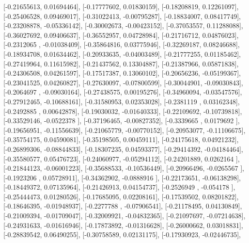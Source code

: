 \documentclass{article}
\begin{document}
       [-0.21655613,  0.01694464],
       [-0.17777602,  0.01830159],
       [-0.18208819,  0.12261097],
       [-0.25406528,  0.09469017],
       [-0.31022413, -0.00795287],
       [-0.18834007,  0.08417749],
       [-0.23208878, -0.05336142],
       [-0.30002673, -0.00423152],
       [-0.37053557,  0.11288088],
       [-0.36027692,  0.09406637],
       [-0.36552957,  0.04728984],
       [-0.21716712,  0.04876023],
       [-0.2312065 , -0.01038409],
       [-0.35864816,  0.03775946],
       [-0.32269187,  0.08246688],
       [-0.18934708,  0.01634462],
       [-0.20933635, -0.04003489],
       [-0.21777255,  0.01185462],
       [-0.27419964,  0.11615982],
       [-0.21437562,  0.13304887],
       [-0.21387966,  0.05871838],
       [-0.24306508,  0.04261597],
       [-0.17517387,  0.13060102],
       [-0.20656236, -0.05199367],
       [-0.23041525,  0.04260827],
       [-0.27630097, -0.07800599],
       [-0.30044901, -0.09030843],
       [-0.2064697 , -0.09030164],
       [-0.27438575,  0.00195276],
       [-0.34960094, -0.03547576],
       [-0.27912465, -0.10688161],
       [-0.31580953,  0.02353028],
       [-0.2381119 ,  0.03162348],
       [-0.2492885 ,  0.00642878],
       [-0.19030032, -0.01640333],
       [-0.22109692, -0.10739818],
       [-0.33529146, -0.0522378 ],
       [-0.37196465, -0.00827352],
       [-0.3339665 ,  0.0179692 ],
       [-0.19656951, -0.11556639],
       [-0.21065779, -0.00770152],
       [-0.20953077, -0.11106675],
       [-0.35754175,  0.04590081],
       [-0.35198505,  0.00459111],
       [-0.24175618,  0.04921232],
       [-0.26899306, -0.08844833],
       [-0.18307235,  0.04593377],
       [-0.29414392, -0.04184464],
       [-0.35580577,  0.05476723],
       [-0.24060977, -0.05294112],
       [-0.24201889,  0.0262164 ],
       [-0.21844123, -0.06001223],
       [-0.35688533, -0.10536449],
       [-0.20966496, -0.0265567 ],
       [-0.1923206 ,  0.05728911],
       [-0.34362902, -0.0888916 ],
       [-0.22173651, -0.06138298],
       [-0.18449372,  0.07135964],
       [-0.21426913,  0.04154737],
       [-0.2526949 , -0.054178  ],
       [-0.25444473,  0.01280526],
       [-0.17685095,  0.02208161],
       [-0.17539502,  0.08201822],
       [-0.18646395, -0.01948937],
       [-0.2277788 , -0.07906541],
       [-0.21178495,  0.04130849],
       [-0.21009394, -0.01709047],
       [-0.32009921, -0.04832365],
       [-0.21097697, -0.07214638],
       [-0.24931633, -0.01616946],
       [-0.17873892, -0.01316628],
       [-0.26000662,  0.03018831],
       [-0.28839542,  0.06490255],
       [-0.30758589,  0.02131175],
       [-0.17930923, -0.02446735],
\end{document}
